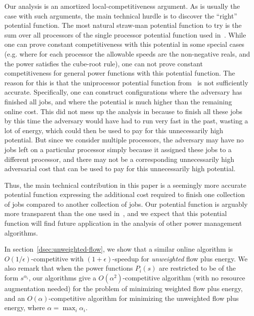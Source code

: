 \documentclass[11pt]{article}
\begin{document}
Our analysis is an amortized local-competitiveness argument. As is
usually the case with such arguments, the main technical hurdle is to
discover the ``right'' potential function. The most natural straw-man potential function to try is the sum over all
processors of the single processor potential function used
in~\cite{BCP}.  While one can prove constant competitiveness with this
potential in some special cases (e.g. where for each processor the
allowable speeds are the non-negative reals, and the power satisfies the
cube-root rule), one can not prove constant competitiveness for general
power functions with this potential function.  The reason for this is
that the uniprocessor potential function from~\cite{BCP} is not
sufficiently accurate.  Specifically, one can construct
configurations where the adversary has finished all jobs, and where the
potential is much higher than the remaining online cost. This did not
mess up the analysis in \cite{BCP} because to finish all these jobs by
this time the adversary would have had to run very fast in the past,
wasting a lot of energy, which could then be used to pay for this
unnecessarily high potential.  But since we consider multiple
processors, the adversary may have no jobs left on a particular
processor simply because it assigned these jobs to a different
processor, and there may not be a corresponding unnecessarily high
adversarial cost that can be used to pay for this unnecessarily high
potential. 

Thus, the main technical contribution in this paper is a seemingly
more accurate potential function expressing the additional cost required
to finish one collection of jobs compared to another collection of
jobs. Our potential function is arguably more transparent than the one used in~\cite{BCP},
and we expect that
this potential function will find future application in
the analysis of other power management algorithms.


In section~\ref{dsec:unweighted-flow}, we show that a similar online algorithm is
$O(1/\epsilon)$-competitive with $(1+\epsilon)$-speedup for
\emph{unweighted} flow plus energy.
We also remark that when the power functions $P_i(s)$ are
restricted to be of the form $s^{\alpha_i}$, our algorithms give a
$O(\alpha^2)$-competitive algorithm (with no resource augmentation needed) for the problem of minimizing weighted flow plus energy, and an
$O(\alpha)$-competitive algorithm for minimizing the unweighted flow plus energy,
where $\alpha = \max_i \alpha_i$.
\end{document}
